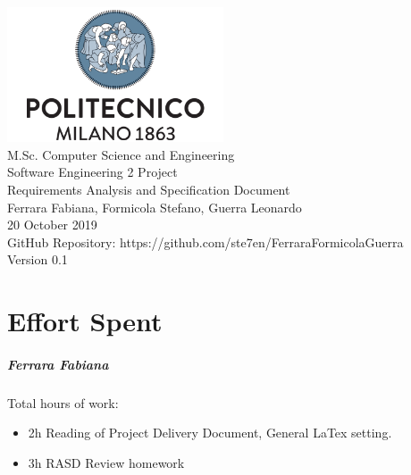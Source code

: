 \documentclass{report}
\newcommand{\image}[4]{
	\begin{figure}[H]
	\centering
	\texttt{[image: \#2]}
	\caption*{#3}
	\label{#4}

	\label{fig:nonfloat} %
	\end{figure}
}
\begin{document}
	\begin{titlepage}
		\centering	
		\vfill
		{
			\includegraphics[width =\linewidth, height = 4cm, keepaspectratio]{PolitecnicoLogo.png}
			\label{fig:PolitecnicoLogo}
			\large \\[2ex]M.Sc. Computer Science and Engineering\\
			\large Software Engineering 2 Project\\[9ex]			
			\huge Requirements Analysis and Specification Document\\[4ex]

			\normalsize Ferrara Fabiana, Formicola Stefano, Guerra Leonardo\\[1.5ex]
			\normalsize 20 October 2019 \\[1.5ex]
			\normalsize GitHub Repository: https://github.com/ste7en/FerraraFormicolaGuerra\\[3ex]
			\normalsize Version 0.1


		}
		
	\end{titlepage}

	
	\newpage
	\tableofcontents
	\thispagestyle{fancy}
	
	\newpage
	
	
	
	
	
		
	\chapter{Effort Spent}
	\thispagestyle{fancy}
		\paragraph{Ferrara Fabiana} Total hours of work: 
			\begin{itemize}
				\item 2h Reading of Project Delivery Document, General LaTex setting.
				\item 3h RASD Review homework

			\end{itemize}
\end{document}
